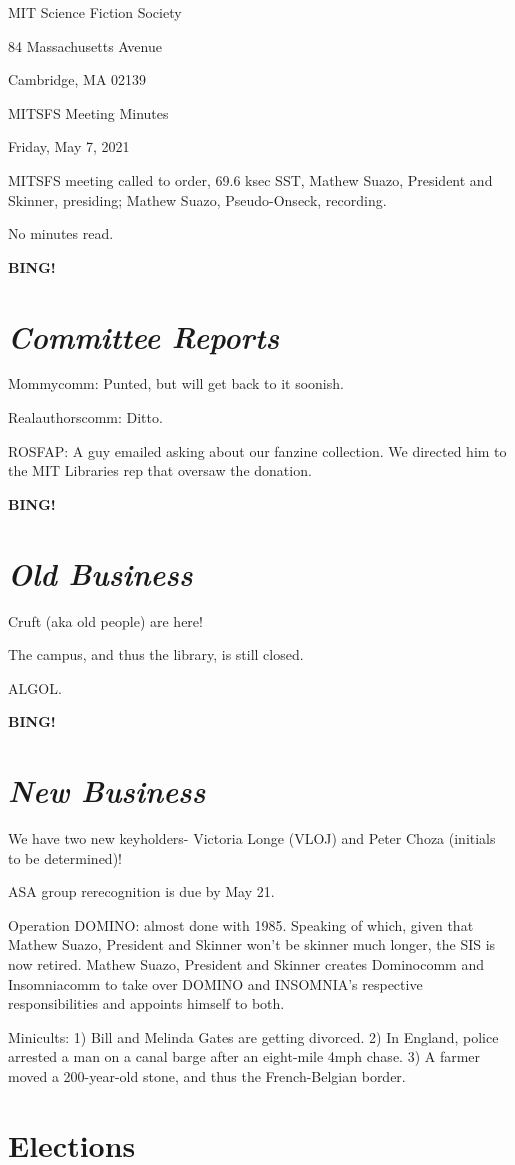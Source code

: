 \documentclass[10pt]{article}
\newcommand{\bing}{{\bf BING!} }
\newcommand{\goto}[1]{\bing \vskip 12pt \section*{{\em{#1}}}}
\newcommand{\skinner}{Mathew Suazo, President and Skinner\xspace}
\newcommand{\onseck}{Mathew Suazo, Pseudo-Onseck\xspace}
\newcommand{\meetingdate}{Friday, May 7, 2021}
\begin{document}
\begin{center}

MIT Science Fiction Society

84 Massachusetts Avenue

Cambridge, MA 02139

\vspace{12pt}

MITSFS Meeting Minutes

\meetingdate

\end{center}

\vspace{18pt}

\setlength{\parskip}{6pt}

\noindent
MITSFS meeting called to order, 69.6 ksec SST,
\skinner, presiding; \onseck, recording.

No minutes read.

\goto{Committee Reports}

Mommycomm: Punted, but will get back to it soonish.

Realauthorscomm: Ditto.

ROSFAP: A guy emailed asking about our fanzine collection. We directed him to the MIT Libraries rep that oversaw the donation.

\goto{Old Business}

Cruft (aka old people) are here!

The campus, and thus the library, is still closed.

ALGOL.

\goto{New Business}

We have two new keyholders- Victoria Longe (VLOJ) and Peter Choza (initials to be determined)!

ASA group rerecognition is due by May 21.

Operation DOMINO: almost done with 1985. Speaking of which, given that \skinner won't be skinner much longer, the SIS is now retired. \skinner creates Dominocomm and Insomniacomm to take over DOMINO and INSOMNIA's respective responsibilities and appoints himself to both.

Minicults: 1) Bill and Melinda Gates are getting divorced. 2) In England, police arrested a man on a canal barge after an eight-mile 4mph chase. 3) A farmer moved a 200-year-old stone, and thus the French-Belgian border.

\section{Elections}
\end{document}
